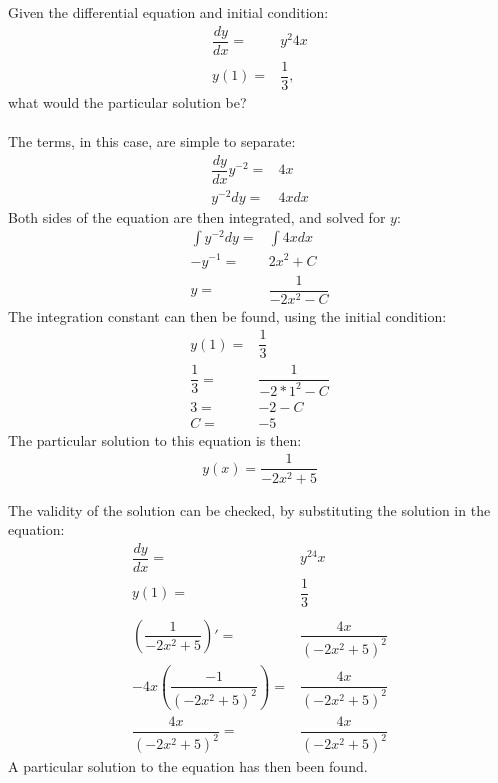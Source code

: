 \begin{tcolorbox}[colback=red!5!white,colframe=red!55!black,title=Example of solving a separable differential equation] 

Given the differential equation and initial condition:
\begin{align*}
	\dfrac{dy}{dx} =& y^2 4x \\
	y(1) =& \dfrac{1}{3},
\end{align*}
what would the particular solution be?
\\ \\
The terms, in this case, are simple to separate: 
\begin{align*}
	\dfrac{dy}{dx} y^{-2} =& 4x \\
	y^{-2} dy =& 4x dx 
\end{align*}
Both sides of the equation are then integrated, and solved for $y$:
\begin{align*}
	\int{y^{-2} dy} =& \int{4x dx} \\
	-y^{-1} =& 2x^2 +C \\
	y =& \dfrac{1}{-2x^2-C}
\end{align*}
The integration constant can then be found, using the initial condition:
\begin{align*}
	y(1) =& \dfrac{1}{3} \\
	\dfrac{1}{3} =& \dfrac{1}{-2*1^2-C} \\
	3 =& -2-C \\
	C =& -5
\end{align*}
The particular solution to this equation is then:
\begin{align*}
	y(x) = \dfrac{1}{-2x^2+5}
\end{align*}

The validity of the solution can be checked, by substituting the solution in the equation:
\begin{align*}
	\dfrac{dy}{dx} =& y^24x \\
	y(1) =& \dfrac{1}{3}  \\
	\\
	\left(\dfrac{1}{-2x^2+5}\right)' =& \dfrac{4x}{(-2x^2+5)^2} \\
	-4x\left(\dfrac{-1}{(-2x^2+5)^2}\right)  =& \dfrac{4x}{(-2x^2+5)^2} \\
	\dfrac{4x}{(-2x^2+5)^2} =& \dfrac{4x}{(-2x^2+5)^2}
\end{align*}
A particular solution to the equation has then been found.
\end{tcolorbox}
